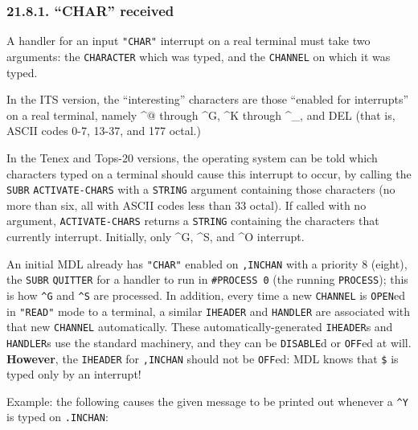 \documentclass[a4paper,]{article}
\begin{document}
\subsubsection{\texorpdfstring{21.8.1. ``CHAR'' received}{21.8.1. CHAR received}}\label{char-received}

A handler for an input \texttt{"CHAR"} interrupt on a real terminal must take two arguments: the \texttt{CHARACTER} which
was typed, and the \texttt{CHANNEL} on which it was typed.

In the ITS version, the ``interesting'' characters are those ``enabled for interrupts'' on a real
terminal, namely \^{}@ through \^{}G, \^{}K through \^{}\_, and DEL (that is, ASCII codes 0-7,
13-37, and 177 octal.)

In the Tenex and Tops-20 versions, the operating system can be told which
characters typed on a terminal should cause this interrupt to occur, by calling the \texttt{SUBR} \texttt{ACTIVATE-CHARS}
 with a \texttt{STRING} argument containing those characters (no more than six, all
with ASCII codes less than 33 octal). If called with no argument, \texttt{ACTIVATE-CHARS} returns a \texttt{STRING}
containing the characters that currently interrupt. Initially, only \^{}G, \^{}S, and \^{}O
interrupt.

An initial MDL already has \texttt{"CHAR"} enabled on \texttt{,INCHAN} with a priority 8 (eight), the \texttt{SUBR}
\texttt{QUITTER} for a handler to run in \texttt{\#PROCESS\ 0} (the running
\texttt{PROCESS}); this is how \texttt{\^{}G} and \texttt{\^{}S} are processed. In addition, every time a new
\texttt{CHANNEL} is \texttt{OPEN}ed in \texttt{"READ"}  mode to a terminal, a
similar \texttt{IHEADER} and \texttt{HANDLER} are associated with that new \texttt{CHANNEL}
automatically. These automatically-generated \texttt{IHEADER}s and \texttt{HANDLER}s use the standard machinery, and they
can be \texttt{DISABLE}d or \texttt{OFF}ed at will. \textbf{However}, the \texttt{IHEADER} for \texttt{,INCHAN} should not
be \texttt{OFF}ed: MDL knows that \texttt{\$}  is typed only by an interrupt!

Example: the following causes the given message to be printed out whenever a \texttt{\^{}Y} is typed on \texttt{.INCHAN}:
\end{document}
